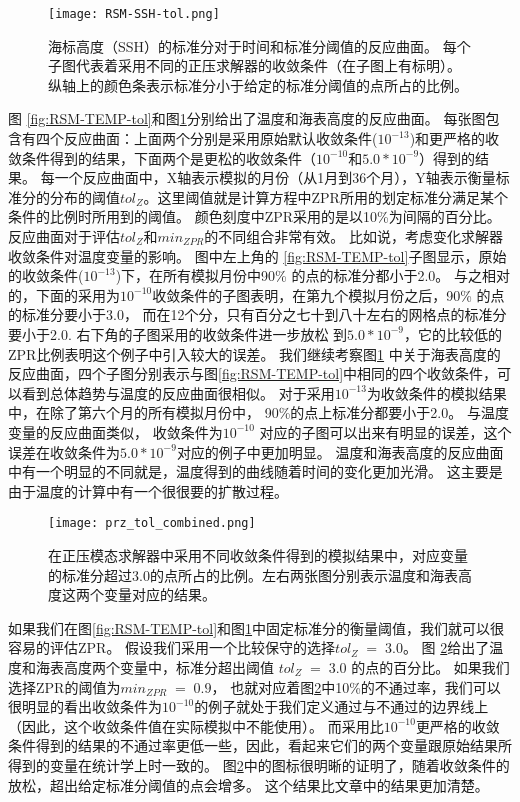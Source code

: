 \begin {figure} 
\centering
\texttt{[image: RSM-SSH-tol.png]}
\caption {海标高度（SSH）的标准分对于时间和标准分阈值的反应曲面。 每个子图代表着采用不同的正压求解器的收敛条件（在子图上有标明）。纵轴上的颜色条表示标准分小于给定的标准分阈值的点所占的比例。}
\label{fig:RSM-SSH-tol}
\end {figure}

图 \ref{fig:RSM-TEMP-tol}和图\ref{fig:RSM-SSH-tol}分别给出了温度和海表高度的反应曲面。 
每张图包含有四个反应曲面：上面两个分别是采用原始默认收敛条件($10^{-13}$)和更严格的收敛条件得到的结果，下面两个是更松的收敛条件（$10^{-10}$和$5.0*10^{-9}$）得到的结果。 
每一个反应曲面中，X轴表示模拟的月份（从1月到36个月），Y轴表示衡量标准分的分布的阈值$tol_{Z}$。这里阈值就是计算方程中ZPR所用的划定标准分满足某个条件的比例时所用到的阈值。
颜色刻度中ZPR采用的是以10\%为间隔的百分比。 
反应曲面对于评估$tol_{Z}$和$min_{ZPR}$的不同组合非常有效。
比如说，考虑变化求解器收敛条件对温度变量的影响。 图中左上角的 \ref{fig:RSM-TEMP-tol}子图显示，原始的收敛条件($10^{-13}$)下，在所有模拟月份中90\% 的点的标准分都小于2.0。
与之相对的，下面的采用为$10^{-10}$收敛条件的子图表明，在第九个模拟月份之后，90\% 的点的标准分要小于3.0， 而在12个分，只有百分之七十到八十左右的网格点的标准分要小于2.0. 
右下角的子图采用的收敛条件进一步放松 到$5.0*10^{-9}$，它的比较低的ZPR比例表明这个例子中引入较大的误差。
我们继续考察图\ref{fig:RSM-SSH-tol} 中关于海表高度的反应曲面，四个子图分别表示与图\ref{fig:RSM-TEMP-tol}中相同的四个收敛条件，可以看到总体趋势与温度的反应曲面很相似。 
对于采用$10^{-13}$为收敛条件的模拟结果中，在除了第六个月的所有模拟月份中， 90\%的点上标准分都要小于2.0。 
与温度变量的反应曲面类似， 收敛条件为$10^{-10}$ 对应的子图可以出来有明显的误差，这个误差在收敛条件为$5.0*10^{-9}$对应的例子中更加明显。 
温度和海表高度的反应曲面中有一个明显的不同就是，温度得到的曲线随着时间的变化更加光滑。 这主要是由于温度的计算中有一个很很要的扩散过程。

 

\begin{figure} 
\centering 
\texttt{[image: prz\_tol\_combined.png]}
\caption { 
  在正压模态求解器中采用不同收敛条件得到的模拟结果中，对应变量的标准分超过3.0的点所占的比例。左右两张图分别表示温度和海表高度这两个变量对应的结果。}
\label {fig:PRZ-tol}
\end{figure}

如果我们在图\ref{fig:RSM-TEMP-tol}和图\ref{fig:RSM-SSH-tol}中固定标准分的衡量阈值，我们就可以很容易的评估ZPR。 
假设我们采用一个比较保守的选择$tol_{Z} \; = \; 3.0$。 
图 \ref{fig:PRZ-tol}给出了温度和海表高度两个变量中，标准分超出阈值 $tol_{Z} \; = \; 3.0$ 的点的百分比。 
如果我们选择ZPR的阈值为$min_{ZPR} \; = \; 0.9$， 也就对应着图\ref{fig:PRZ-tol}中10\%的不通过率，我们可以很明显的看出收敛条件为$10^{-10}$的例子就处于我们定义通过与不通过的边界线上（因此，这个收敛条件值在实际模拟中不能使用）。 
而采用比$10^{-10}$更严格的收敛条件得到的结果的不通过率更低一些，因此，看起来它们的两个变量跟原始结果所得到的变量在统计学上时一致的。
图\ref{fig:PRZ-tol}中的图标很明晰的证明了，随着收敛条件的放松，超出给定标准分阈值的点会增多。 
这个结果比文章\cite{yong2015}中的结果更加清楚。 
